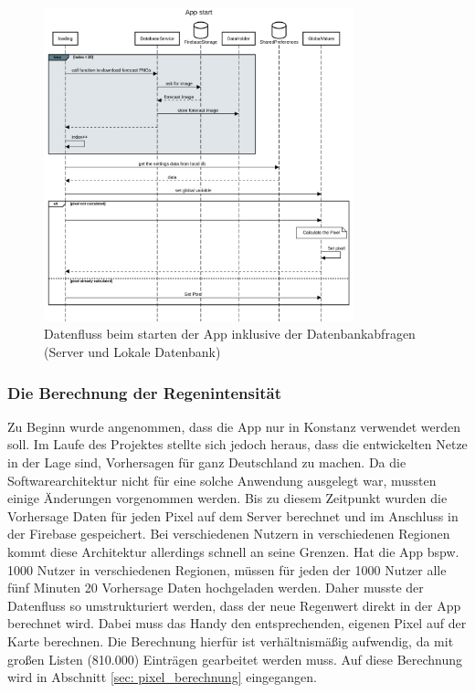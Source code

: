 \begin{figure}[H]
 \centering
 \includegraphics[width=0.8\textwidth,angle=0]{abb/sequence_diagram_app_start}
 \caption[Sequencediagram Appstart]{Datenfluss beim starten der App inklusive der Datenbankabfragen (Server und Lokale Datenbank)}
\label{fig:sequence_diagram_app_start}
\end{figure}

\subsubsection{Die Berechnung der Regenintensität}
Zu Beginn wurde angenommen, dass die App nur in Konstanz verwendet werden soll. 
Im Laufe des Projektes stellte sich jedoch heraus, dass die entwickelten Netze in der Lage sind, Vorhersagen 
für ganz Deutschland zu machen. Da die Softwarearchitektur nicht für eine solche Anwendung ausgelegt war, 
mussten einige Änderungen vorgenommen werden. 
Bis zu diesem Zeitpunkt wurden die Vorhersage Daten für jeden Pixel auf dem Server berechnet und im Anschluss in 
der Firebase gespeichert. 
Bei verschiedenen Nutzern in verschiedenen Regionen kommt diese Architektur allerdings schnell an seine Grenzen. 
Hat die App bspw. 1000 Nutzer in verschiedenen Regionen, 
müssen für jeden der 1000 Nutzer alle fünf Minuten 20 Vorhersage Daten hochgeladen werden. 
Daher musste der Datenfluss so umstrukturiert werden, dass der neue Regenwert direkt in der App berechnet wird. 
Dabei muss das Handy den entsprechenden, eigenen Pixel auf der Karte berechnen. 
Die Berechnung hierfür ist verhältnismäßig aufwendig, da mit großen Listen (810.000) Einträgen gearbeitet werden muss.
Auf diese Berechnung wird in Abschnitt \ref{sec: pixel_berechnung} eingegangen. 

